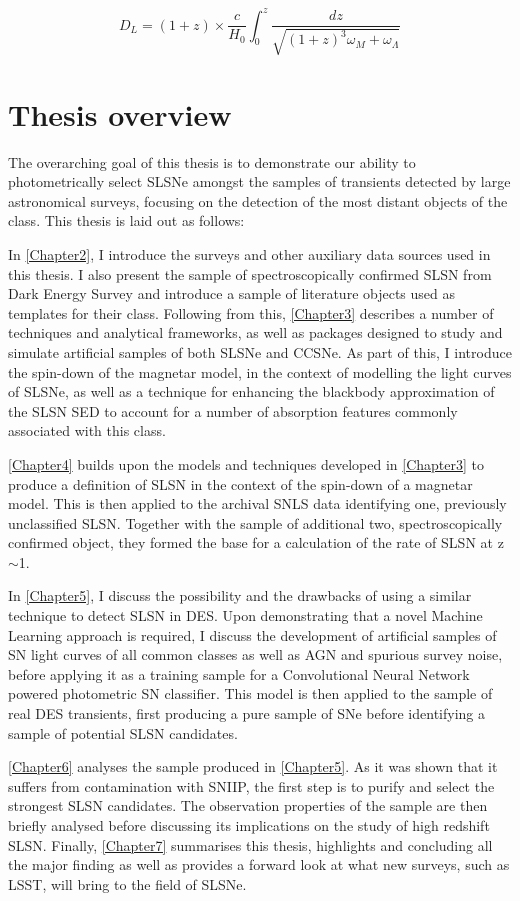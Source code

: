 \begin{equation} \label{eq:LumDist}
  D_L = (1+z) \times \frac{c}{H_0} \int^{z}_{0} \frac{dz}{\sqrt{(1+z)^3 \omega_M + \omega_{\Lambda}}}
\end{equation}

\section{Thesis overview}
The overarching goal of this thesis is to demonstrate our ability to photometrically select SLSNe amongst the samples of transients detected by large astronomical surveys, focusing on the detection of the most distant objects of the class. This thesis is laid out as follows:

In \cref{Chapter2}, I introduce the surveys and other auxiliary data sources used in this thesis. I also present the sample of spectroscopically confirmed SLSN from Dark Energy Survey and introduce a sample of literature objects used as templates for their class. Following from this, \cref{Chapter3} describes a number of techniques and analytical frameworks, as well as packages designed to study and simulate artificial samples of both SLSNe and CCSNe. As part of this, I introduce the spin-down of the magnetar model, in the context of modelling the light curves of SLSNe, as well as a technique for enhancing the blackbody approximation of the SLSN SED to account for a number of absorption features commonly associated with this class.

\cref{Chapter4} builds upon the models and techniques developed in \cref{Chapter3} to produce a definition of SLSN in the context of the spin-down of a magnetar model. This is then applied to the archival SNLS data identifying one, previously unclassified SLSN. Together with the sample of additional two, spectroscopically confirmed object, they formed the base for a calculation of the rate of SLSN at z$\sim$1.

In \cref{Chapter5}, I discuss the possibility and the drawbacks of using a similar technique to detect SLSN in DES. Upon demonstrating that a novel Machine Learning approach is required, I discuss the development of artificial samples of SN light curves of all common classes as well as AGN and spurious survey noise, before applying it as a training sample for a Convolutional Neural Network powered photometric SN classifier. This model is then applied to the sample of real DES transients, first producing a pure sample of SNe before identifying a sample of potential SLSN candidates.

\cref{Chapter6} analyses the sample produced in \cref{Chapter5}. As it was shown that it suffers from contamination with SNIIP, the first step is to purify and select the strongest SLSN candidates. The observation properties of the sample are then briefly analysed before discussing its implications on the study of high redshift SLSN. Finally, \cref{Chapter7} summarises this thesis, highlights and concluding all the major finding as well as provides a forward look at what new surveys, such as LSST, will bring to the field of SLSNe.
